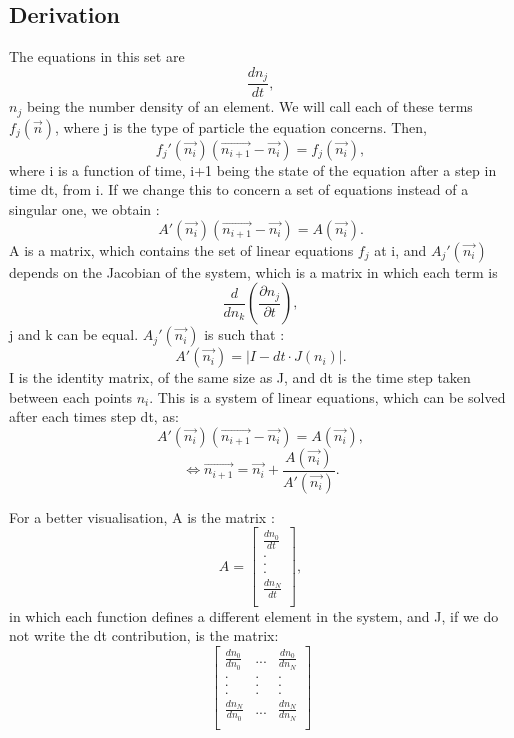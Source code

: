 \documentclass[a4paper, 12pt]{article}
\begin{document}
\subsection{Derivation}
\label{subsec:der}
The equations in this set are $$\frac{dn_j}{dt},$$
$n_j$ being the number density of an element. We will call each of these terms $f_j(\vec{n})$, where j is the type of particle the equation concerns. Then,
$$f_j'(\vec{n_i})(\vec{n_{i+1}}-\vec{n_i}) = f_j(\vec{n_i}),$$
where i is a function of time, i+1 being the state of the equation after a step in time dt, from i. If we change this to concern a set of equations instead of a singular one, we obtain : 
$$A'(\vec{n_i})(\vec{n_{i+1}}-\vec{n_i}) = A(\vec{n_i}).$$ 
A is a matrix, which contains the set of linear equations $f_j$ at i, and $A_j'(\vec{n_i})$ depends on the Jacobian of the system, which is a matrix in which each term is
$$\frac{d}{dn_k}(\frac{\partial n_j}{\partial t}),$$ 
j and k can be equal. $A_j'(\vec{n_i})$ is such that :
$$A'(\vec{n_i}) = |I - dt\cdot J(n_i)|.$$
I is the identity matrix, of the same size as J, and dt is the time step taken between each points $n_i$. This is a system of linear equations, which can be solved after each times step dt, as:
$$A'(\vec{n_i})(\vec{n_{i+1}}-\vec{n_i}) = A(\vec{n_i}),$$
$$\Leftrightarrow \vec{n_{i+1}} = \vec{n_i} + \frac{A(\vec{n_i})}{A'(\vec{n_i})}.$$

For a better visualisation, A is the matrix :
$$A = \begin{bmatrix}
    \frac{dn_0}{dt}\\
     .\\
     .\\
     .\\
     \frac{dn_N}{dt}\\
\end{bmatrix},$$
in which each function defines a different element in the system, and J, if we do not write the dt contribution, is the matrix:
$$\begin{bmatrix}
    \frac{dn_0}{dn_0} & ... & \frac{dn_0}{dn_N}\\
    . & . & .\\
    . & . & .\\
    . & . & .\\
    \frac{dn_N}{dn_0} & ... & \frac{dn_N}{dn_N}\\
\end{bmatrix}$$
\end{document}
